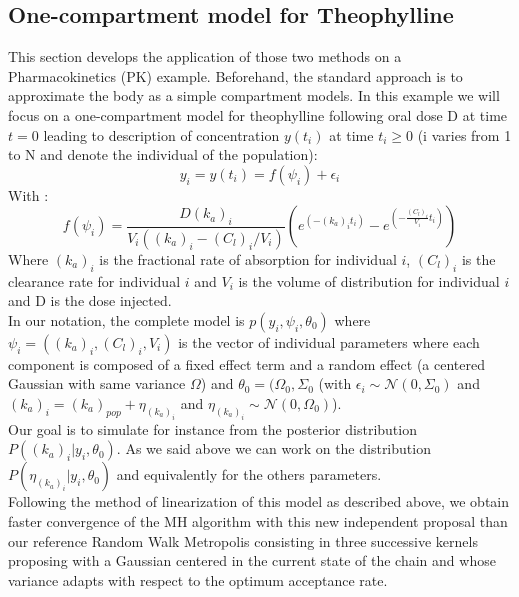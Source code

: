 \documentclass{article}
\begin{document}
\subsection{One-compartment model for Theophylline}
This section develops the application of those two methods on a Pharmacokinetics (PK) example. Beforehand, the standard approach is to approximate the body as a simple compartment models. In this example we will focus on a one-compartment model for theophylline following oral dose D at time $t=0$ leading to description of concentration $y(t_i)$ at time $t_i \geq 0$ (i varies from 1 to N and denote the individual of the population):
\begin{equation}
y_i = y(t_i) = f(\psi_i)+ \epsilon_i
\end{equation}
With :
\begin{equation}
f(\psi_i) = \frac{D(k_a)_i}{V_i((k_a)_i - (C_l)_i/V_i)}(e^{(-(k_a)_it_i)}-e^{(-\frac{(C_l)_i}{V_i}t_i)})
\end{equation}
Where $(k_a)_i$ is the fractional rate of absorption for individual $i$, $(C_l)_i$ is the clearance rate for individual $i$ and $V_i$ is the volume of distribution for individual $i$ and D is the dose injected.\\
In our notation, the complete model is $p(y_i,\psi_i,\theta_0)$ where $\psi_i = ((k_a)_i, (C_l)_i, V_i)$ is the vector of individual parameters where each component is composed of a fixed effect term and a random effect (a centered Gaussian with same variance $\Omega$) and $\theta_0 = (\Omega_0, \Sigma_0$ (with $\epsilon_i \sim \mathcal{N}(0,\Sigma_0)$ and $(k_a)_i = (k_a)_{pop} + \eta_{(k_a)_i}$ and $\eta_{(k_a)_i} \sim \mathcal{N}(0,\Omega_0)$).\\
Our goal is to simulate for instance from the posterior distribution $P((k_a)_i|y_i,\theta_0)$. As we said above we can work on the distribution $P(\eta_{(k_a)_i}|y_i,\theta_0)$ and equivalently for the others parameters.\\
Following the method of linearization of this model as described above, we obtain faster convergence of the MH algorithm with this new independent proposal than our reference Random Walk Metropolis consisting in three successive kernels proposing with a Gaussian centered in the current state of the chain and whose variance adapts with respect to the optimum acceptance rate.
\end{document}
